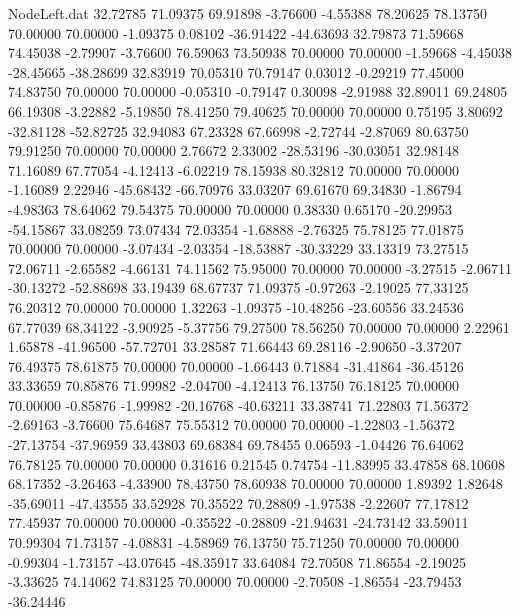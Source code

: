 \begin{filecontents}{NodeLeft.dat}
  32.72785   71.09375   69.91898    -3.76600   -4.55388   78.20625   78.13750   70.00000   70.00000   -1.09375    0.08102  -36.91422  -44.63693
  32.79873   71.59668   74.45038    -2.79907   -3.76600   76.59063   73.50938   70.00000   70.00000   -1.59668   -4.45038  -28.45665  -38.28699
  32.83919   70.05310   70.79147     0.03012   -0.29219   77.45000   74.83750   70.00000   70.00000   -0.05310   -0.79147    0.30098   -2.91988
  32.89011   69.24805   66.19308    -3.22882   -5.19850   78.41250   79.40625   70.00000   70.00000    0.75195    3.80692  -32.81128  -52.82725
  32.94083   67.23328   67.66998    -2.72744   -2.87069   80.63750   79.91250   70.00000   70.00000    2.76672    2.33002  -28.53196  -30.03051
  32.98148   71.16089   67.77054    -4.12413   -6.02219   78.15938   80.32812   70.00000   70.00000   -1.16089    2.22946  -45.68432  -66.70976
  33.03207   69.61670   69.34830    -1.86794   -4.98363   78.64062   79.54375   70.00000   70.00000    0.38330    0.65170  -20.29953  -54.15867
  33.08259   73.07434   72.03354    -1.68888   -2.76325   75.78125   77.01875   70.00000   70.00000   -3.07434   -2.03354  -18.53887  -30.33229
  33.13319   73.27515   72.06711    -2.65582   -4.66131   74.11562   75.95000   70.00000   70.00000   -3.27515   -2.06711  -30.13272  -52.88698
  33.19439   68.67737   71.09375    -0.97263   -2.19025   77.33125   76.20312   70.00000   70.00000    1.32263   -1.09375  -10.48256  -23.60556
  33.24536   67.77039   68.34122    -3.90925   -5.37756   79.27500   78.56250   70.00000   70.00000    2.22961    1.65878  -41.96500  -57.72701
  33.28587   71.66443   69.28116    -2.90650   -3.37207   76.49375   78.61875   70.00000   70.00000   -1.66443    0.71884  -31.41864  -36.45126
  33.33659   70.85876   71.99982    -2.04700   -4.12413   76.13750   76.18125   70.00000   70.00000   -0.85876   -1.99982  -20.16768  -40.63211
  33.38741   71.22803   71.56372    -2.69163   -3.76600   75.64687   75.55312   70.00000   70.00000   -1.22803   -1.56372  -27.13754  -37.96959
  33.43803   69.68384   69.78455     0.06593   -1.04426   76.64062   76.78125   70.00000   70.00000    0.31616    0.21545    0.74754  -11.83995
  33.47858   68.10608   68.17352    -3.26463   -4.33900   78.43750   78.60938   70.00000   70.00000    1.89392    1.82648  -35.69011  -47.43555
  33.52928   70.35522   70.28809    -1.97538   -2.22607   77.17812   77.45937   70.00000   70.00000   -0.35522   -0.28809  -21.94631  -24.73142
  33.59011   70.99304   71.73157    -4.08831   -4.58969   76.13750   75.71250   70.00000   70.00000   -0.99304   -1.73157  -43.07645  -48.35917
  33.64084   72.70508   71.86554    -2.19025   -3.33625   74.14062   74.83125   70.00000   70.00000   -2.70508   -1.86554  -23.79453  -36.24446

\end{filecontents}
